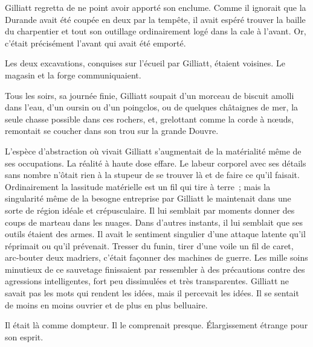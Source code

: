 \documentclass[french,twoside]{book} %
\begin{document}
Gilliatt regretta de ne point avoir apporté son enclume. Comme il ignorait que la Durande avait été coupée en deux par la tempête, il avait espéré trouver la baille du charpentier et tout son outillage ordinairement logé dans la cale à l’avant. Or, c’était précisément l’avant qui avait été emporté.\par
Les deux excavations, conquises sur l’écueil par Gilliatt, étaient voisines. Le magasin et la forge communiquaient.\par
 Tous les soirs, sa journée finie, Gilliatt soupait d’un morceau de biscuit amolli dans l’eau, d’un oursin ou d’un poingclos, ou de quelques châtaignes de mer, la seule chasse possible dans ces rochers, et, grelottant comme la corde à nœuds, remontait se coucher dans son trou sur la grande Douvre.\par
L’espèce d’abstraction où vivait Gilliatt s’augmentait de la matérialité même de ses occupations. La réalité à haute dose effare. Le labeur corporel avec ses détails sans nombre n’ôtait rien à la stupeur de se trouver là et de faire ce qu’il faisait. Ordinairement la lassitude matérielle est un fil qui tire à terre ; mais la singularité même de la besogne entreprise par Gilliatt le maintenait dans une sorte de région idéale et crépusculaire. Il lui semblait par moments donner des coups de marteau dans les nuages. Dans d’autres instants, il lui semblait que ses outils étaient des armes. Il avait le sentiment singulier d’une attaque latente qu’il réprimait ou qu’il prévenait. Tresser du funin, tirer d’une voile un fil de caret, arc-bouter deux madriers, c’était façonner des machines de guerre. Les mille soins minutieux de ce sauvetage finissaient par ressembler à des précautions contre des agressions intelligentes, fort peu dissimulées et très transparentes. Gilliatt ne savait pas les mots qui rendent les idées, mais il percevait les idées. Il se sentait de moins en moins ouvrier et de plus en plus belluaire.\par
Il était là comme dompteur. Il le comprenait presque. Élargissement étrange pour son esprit.\par
\end{document}
